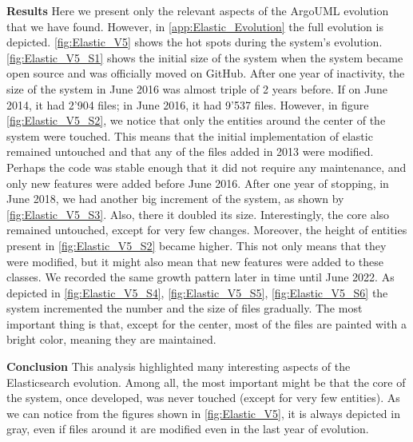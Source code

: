 \textbf{Results}
Here we present only the relevant aspects of the ArgoUML evolution that we have found. However, in \autoref{app:Elastic_Evolution} the full evolution is depicted. \autoref{fig:Elastic_V5} shows the hot spots during the system's evolution. \autoref{fig:Elastic_V5_S1} shows the initial size of the system when the system became open source and was officially moved on GitHub. After one year of inactivity, the size of the system in June 2016 was almost triple of 2 years before. If on June 2014, it had 2'904 files; in June 2016, it had 9'537 files. However, in figure \autoref{fig:Elastic_V5_S2}, we notice that only the entities around the center of the system were touched. This means that the initial implementation of elastic remained untouched and that any of the files added in 2013 were modified. Perhaps the code was stable enough that it did not require any maintenance, and only new features were added before June 2016. After one year of stopping, in June 2018, we had another big increment of the system, as shown by \autoref{fig:Elastic_V5_S3}. Also, there it doubled its size. Interestingly, the core also remained untouched, except for very few changes. Moreover, the height of entities present in \autoref{fig:Elastic_V5_S2} became higher. This not only means that they were modified, but it might also mean that new features were added to these classes. We recorded the same growth pattern later in time until June 2022. As depicted in \autoref{fig:Elastic_V5_S4}, \autoref{fig:Elastic_V5_S5}, \autoref{fig:Elastic_V5_S6} the system incremented the number and the size of files gradually. The most important thing is that, except for the center, most of the files are painted with a bright color, meaning they are maintained. 



\textbf{Conclusion} This analysis highlighted many interesting aspects of the Elasticsearch evolution. Among all, the most important might be that the core of the system, once developed, was never touched (except for very few entities). As we can notice from the figures shown in  \autoref{fig:Elastic_V5}, it is always depicted in gray, even if files around it are modified even in the last year of evolution. 

